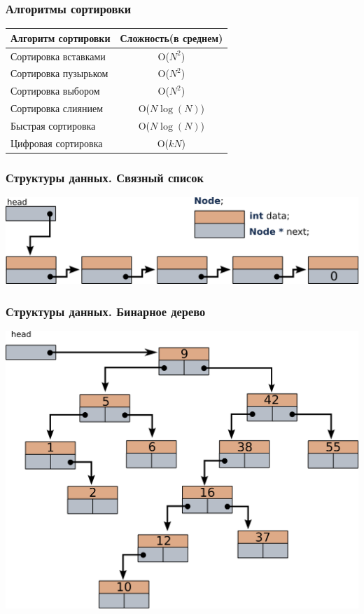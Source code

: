 \documentclass[10pt]{beamer}
\begin{document}
\begin{frame}[fragile]
\frametitle{Алгоритмы сортировки}
\begin{center}
  \begin{tabular}{  l | c }
    Алгоритм сортировки & Сложность(в среднем) \\
    \hline
    Сортировка вставками & O($N^2$)\\
    Сортировка пузырьком & O($N^2$)\\
    Сортировка выбором & O($N^2$)\\
    \hline
    Сортировка слиянием & O($N\log(N)$)\\
    Быстрая сортировка & O($N\log(N)$)\\
    \hline
    Цифровая сортировка &  O($k N$) \\
  \end{tabular}
\end{center}
\end{frame}

\begin{frame}[fragile]
\frametitle{Структуры данных. Связный список} 
\begin{center}
\includegraphics[width=0.99\linewidth]{images/list_initial.png}
\end{center}
\end{frame}

\begin{frame}[fragile]
\frametitle{Структуры данных. Бинарное дерево} 
\begin{center}
\includegraphics[width=0.95\linewidth]{images/bintree_search_1.png}
\end{center}
\end{frame}
\end{document}
